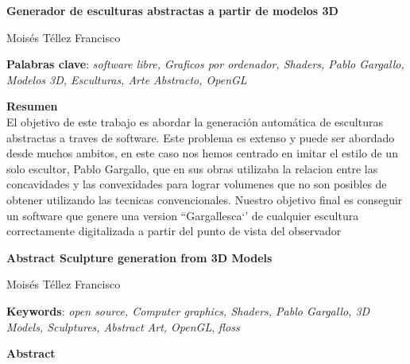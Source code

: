 \thispagestyle{empty}

\begin{center}
{\large\bfseries Generador de esculturas
abstractas a partir de
modelos 3D }\\
\end{center}
\begin{center}
Moisés Téllez Francisco\\
\end{center}


\vspace{0.5cm}
\noindent\textbf{Palabras clave}: \textit{software libre, Graficos por ordenador, Shaders, Pablo Gargallo, Modelos 3D, Esculturas, Arte Abstracto, OpenGL}
\vspace{0.7cm}

\noindent\textbf{Resumen}\\

El objetivo de este trabajo es abordar la generación automática de esculturas abstractas a traves de software. Este problema es extenso
y puede ser abordado desde muchos ambitos, en este caso nos hemos centrado en imitar el estilo de un solo escultor, Pablo Gargallo, que en sus obras utilizaba
la relacion entre las concavidades y las convexidades para lograr volumenes que no son posibles de obtener utilizando las tecnicas convencionales. Nuestro objetivo final
es conseguir un software que genere una version ``Gargallesca`' de cualquier escultura correctamente digitalizada a partir del punto de vista del observador
	

\cleardoublepage

\begin{center}
	{\large\bfseries Abstract Sculpture generation from 3D Models}\\
\end{center}
\begin{center}
	Moisés Téllez Francisco\\
\end{center}
\vspace{0.5cm}
\noindent\textbf{Keywords}: \textit{open source, Computer graphics, Shaders, Pablo Gargallo, 3D Models, Sculptures, Abstract Art, OpenGL}, \textit{floss}
\vspace{0.7cm}

\noindent\textbf{Abstract}\\


\cleardoublepage

